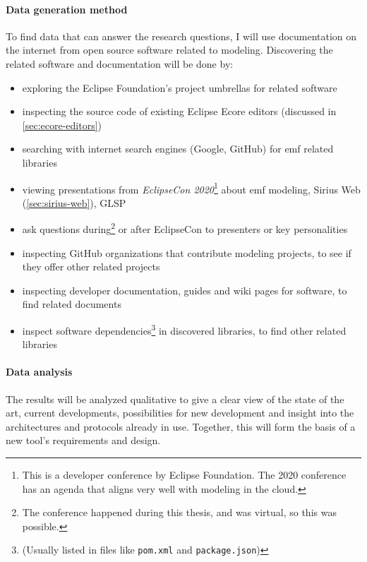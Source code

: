 \paragraph*{Data generation method}
To find data that can answer the research questions, I will use documentation on the internet from \gls{open source} software related to modeling.
Discovering the related software and documentation will be done by:
\begin{itemize}
  \item exploring the Eclipse Foundation's project umbrellas for related software
  \item inspecting the source code of existing \gls{Eclipse} \gls{Ecore} editors (discussed in \cref{sec:ecore-editors})
  \item searching with internet search engines (Google, GitHub) for \gls{emf} related libraries
  \item viewing presentations from \emph{EclipseCon 2020}\footnote{This is a developer conference by Eclipse Foundation. The 2020 conference has an agenda that aligns very well with modeling in the \gls{cloud}.} about \gls{emf} modeling, Sirius Web (\cref{sec:sirius-web}), \acrshort{GLSP}
  \item ask questions during\footnote{The conference happened during this thesis, and was virtual, so this was possible.} or after EclipseCon to presenters or key personalities 
  \item inspecting GitHub organizations that contribute modeling projects, to see if they offer other related projects
  \item inspecting developer documentation, guides and wiki pages for software, to find related documents
  \item inspect software dependencies\footnote{(Usually listed in files like \texttt{pom.xml} and \texttt{package.json})} in discovered libraries, to find other related libraries 
\end{itemize}

\paragraph*{Data analysis}
The results will be analyzed qualitative to give a clear view of the state of the art, current developments, possibilities for new development and insight into the architectures and protocols already in use.
Together, this will form the basis of a new tool's requirements and design.







